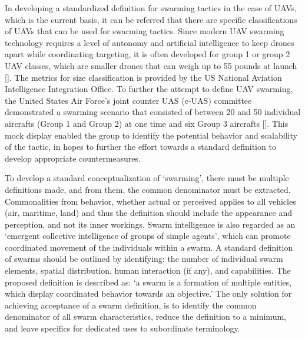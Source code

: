 In developing a standardized definition for swarming tactics in the case of UAVs, which is the current basis, it can be referred that there are specific classifications of UAVs that can be used for swarming tactics. Since modern UAV swarming technology requires a level of autonomy and artificial intelligence to keep drones apart while coordinating targeting, it is often developed for group 1 or group 2 UAV classes, which are smaller drones that can weigh up to 55 pounds at launch []. The metrics for size classification is provided by the US National Aviation Intelligence Integration Office. To further the attempt to define UAV swarming, the United States Air Force’s joint counter UAS (c-UAS) committee demonstrated a swarming scenario that consisted of between 20 and 50 individual aircrafts (Group 1 and Group 2) at one time and six Group 3 aircrafts []. This mock display enabled the group to identify the potential behavior and scalability of the tactic, in hopes to further the effort towards a standard definition to develop appropriate countermeasures.


To develop a standard conceptualization of ‘swarming’, there must be multiple definitions made, and from them, the common denominator must be extracted. Commonalities from behavior, whether actual or perceived applies to all vehicles (air, maritime, land) and thus the definition should include the appearance and perception, and not its inner workings. Swarm intelligence is also regarded as an ‘emergent collective intelligence of groups of simple agents’, which can promote coordinated movement of the individuals within a swarm. A standard definition of swarms should be outlined by identifying: the number of individual swarm elements, spatial distribution, human interaction (if any), and capabilities. The proposed definition is described as: ‘a swarm is a formation of multiple entities, which display coordinated behavior towards an objective.’ The only solution for achieving acceptance of a swarm definition, is to identify the common denominator of all swarm characteristics, reduce the definition to a minimum, and leave specifics for dedicated uses to subordinate terminology. 

